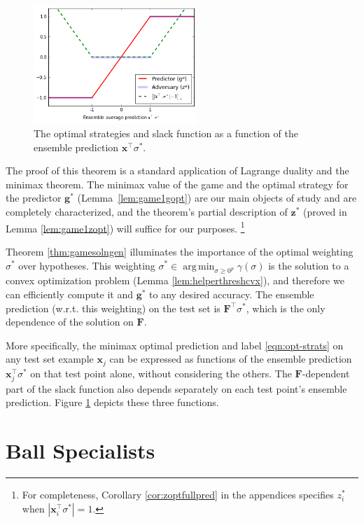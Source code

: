 \documentclass{article}
\DeclareMathOperator*{\argmin}{arg\,min}
\newcommand{\abs}[1]{\left| #1 \right|}
\newcommand{\vF}{\mathbf{F}}
\newcommand{\vx}{\mathbf{x}}
\newcommand{\vg}{\mathbf{g}}
\newcommand{\vz}{\mathbf{z}}
\begin{document}
\begin{figure}
\centering
\includegraphics[width=0.55\textwidth]{figs/optstrats.png}
\caption{
\label{fig:optstrats}
The optimal strategies and slack function as a function of the ensemble prediction $\vx^\top \sigma^*$.}
\end{figure}

The proof of this theorem is a standard application of Lagrange duality and the minimax theorem.
The minimax value of the game and the optimal strategy for the predictor $\vg^*$ (Lemma~\ref{lem:game1gopt}) 
are our main objects of study and are completely characterized, 
and the theorem's partial description of $\vz^*$ (proved in Lemma \ref{lem:game1zopt}) 
will suffice for our purposes. 
\footnote{For completeness, Corollary \ref{cor:zoptfullpred} in the appendices 
specifies $z_i^*$ when $\abs{\vx_{i}^\top \sigma^*} = 1$.}

Theorem \ref{thm:gamesolngen} illuminates the importance of the optimal weighting $\sigma^*$ over hypotheses. 
This weighting $\sigma^* \in \argmin_{\sigma \geq 0^p} \gamma (\sigma)$ is the solution 
to a convex optimization problem (Lemma \ref{lem:helperthreshcvx}), 
and therefore we can efficiently compute it and $\vg^*$ to any desired accuracy. 
The ensemble prediction (w.r.t. this weighting) on the test set is $\vF^\top \sigma^*$, 
which is the only dependence of the solution on $\vF$. 

More specifically, the minimax optimal prediction and label \eqref{eqn:opt-strats} on any test set example $\vx_j$ 
can be expressed as functions of the ensemble prediction $\vx_j^\top \sigma^*$ 
on that test point alone, without considering the others. 
The $\vF$-dependent part of the slack function also depends separately on each test point's ensemble prediction. 
Figure \ref{fig:optstrats} depicts these three functions. 





\section{Ball Specialists}
\end{document}
